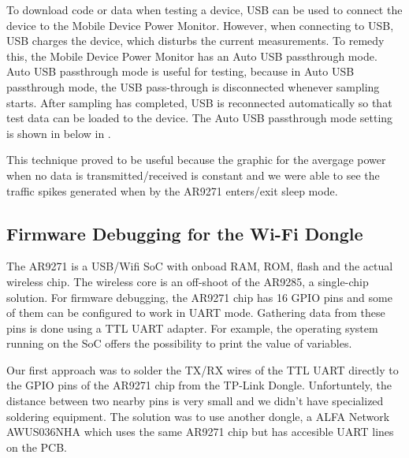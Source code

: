 To download code or data when testing a device, USB can be used to connect the device to
the Mobile Device Power Monitor. However, when connecting to USB, USB charges the
device, which disturbs the current measurements. To remedy this, the Mobile Device Power
Monitor has an Auto USB passthrough mode. Auto USB passthrough mode is useful
for testing, because in Auto USB passthrough mode, the USB pass-through is
disconnected whenever sampling starts. After sampling has completed, USB is reconnected
automatically so that test data can be loaded to the device. The Auto USB passthrough
mode setting is shown in below in .

This technique proved to be useful because the graphic for the avergage power when no data is transmitted/received is constant and we were able to see the traffic spikes generated when by the AR9271 enters/exit sleep mode.


\subsection{Firmware Debugging for the Wi-Fi Dongle}
\label{sec:firmwaredebugging}

The AR9271 is a USB/Wifi SoC with onboad RAM, ROM, flash and the actual wireless chip.  The wireless core is an off-shoot of the AR9285, a single-chip solution. For firmware debugging, the AR9271 chip has 16 GPIO pins and some of them can be configured to work in UART mode.  Gathering data from these pins is done using a TTL UART adapter. For example, the operating system running on the SoC offers the possibility to print the value of variables.

Our first approach was to solder the TX/RX wires of the TTL UART directly to the GPIO pins of the AR9271 chip from the TP-Link Dongle. Unfortuntely, the distance between two nearby pins is very small and we didn't have specialized soldering equipment. The solution was to use another dongle, a ALFA Network AWUS036NHA which uses the same AR9271 chip but has accesible UART lines on the PCB.





 









